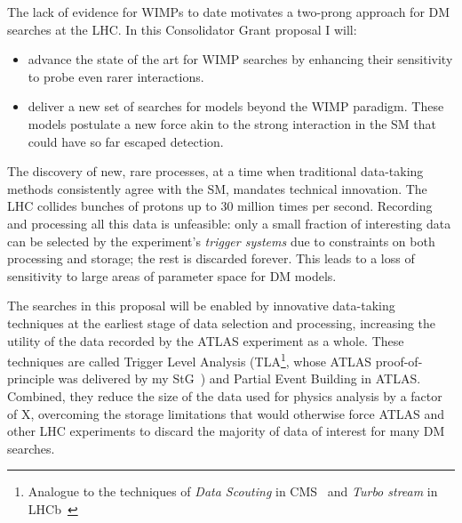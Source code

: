 \documentclass[11pt,a4paper]{article}
\begin{document}
The lack of evidence for WIMPs to date motivates a two-prong approach for DM searches at the LHC. In this Consolidator Grant proposal I will:
\begin{itemize}
    \item advance the state of the art for WIMP searches by enhancing their sensitivity to probe even rarer interactions.%
    \item deliver a new set of searches for models beyond the WIMP paradigm. These models postulate a new force akin to the strong interaction in the SM that could have so far escaped detection. 
\end{itemize}

The discovery of new, rare processes, at a time when traditional data-taking methods consistently agree with the SM, mandates technical innovation. The LHC collides bunches of protons up to 30 million times per second. Recording and processing all this data is unfeasible: only a small fraction of interesting data can be selected by the experiment’s \textit{trigger systems} due to constraints on both processing and storage; the rest is discarded forever. This leads to a loss of sensitivity to large areas of parameter space for DM models. 

The searches in this proposal will be enabled by innovative data-taking techniques at the earliest stage of data selection and processing, increasing the utility of the data recorded by the ATLAS experiment as a whole. 
These techniques are called Trigger Level Analysis (TLA\footnote{Analogue to the techniques of \textit{Data Scouting} in CMS~\cite{Khachatryan:2016ecr} and \textit{Turbo stream} in LHCb~\cite{Aaij:2016rxn}}, whose ATLAS proof-of-principle was delivered by my StG~\cite{Aaboud:2018fzt}) and Partial Event Building in ATLAS. 
Combined, they reduce the size of the data used for physics analysis by a factor of \color{red}X\color{black}, overcoming the storage limitations that would otherwise force ATLAS and other LHC experiments to discard the majority of data of interest for many DM searches. %
\end{document}
